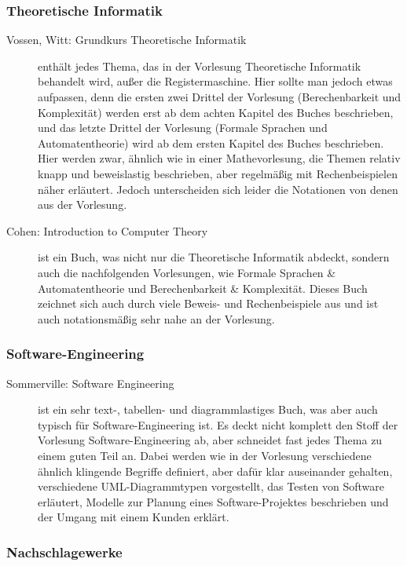 \subsubsection{Theoretische Informatik}
\begin{description}
\item[Vossen, Witt: Grundkurs Theoretische Informatik]{
	enthält jedes Thema, das in der Vorlesung Theoretische Informatik behandelt wird, außer die Registermaschine. Hier sollte man jedoch etwas aufpassen, denn die ersten zwei Drittel der Vorlesung (Berechenbarkeit und Komplexität) werden erst ab dem achten Kapitel des Buches beschrieben, und das letzte Drittel der Vorlesung (Formale Sprachen und Automatentheorie) wird ab dem ersten Kapitel des Buches beschrieben. Hier werden zwar, ähnlich wie in einer Mathevorlesung, die Themen relativ knapp und beweislastig beschrieben, aber regelmäßig mit Rechenbeispielen näher erläutert. Jedoch unterscheiden sich leider die Notationen von denen aus der Vorlesung.}

\item[Cohen: Introduction to Computer Theory]{ 
	ist ein Buch, was nicht nur die Theoretische Informatik abdeckt, sondern auch die nachfolgenden Vorlesungen, wie Formale Sprachen \& Automatentheorie und Berechenbarkeit \& Komplexität. Dieses Buch zeichnet sich auch durch viele Beweis- und Rechenbeispiele aus und ist auch notationsmäßig sehr nahe an der Vorlesung.}
\end{description}

\subsubsection{Software-Engineering}
\begin{description}
\item[Sommerville: Software Engineering]{
	ist ein sehr text-, tabellen- und diagrammlastiges Buch, was aber auch typisch für Software-Engineering ist. Es deckt nicht komplett den Stoff der Vorlesung Software-Engineering ab, aber schneidet fast jedes Thema zu einem guten Teil an. Dabei werden wie in der Vorlesung verschiedene ähnlich klingende Begriffe definiert, aber dafür klar auseinander gehalten, verschiedene UML-Diagrammtypen vorgestellt, das Testen von Software erläutert, Modelle zur Planung eines Software-Projektes beschrieben und der Umgang mit einem Kunden erklärt.}
\end{description}

\subsubsection{Nachschlagewerke}

